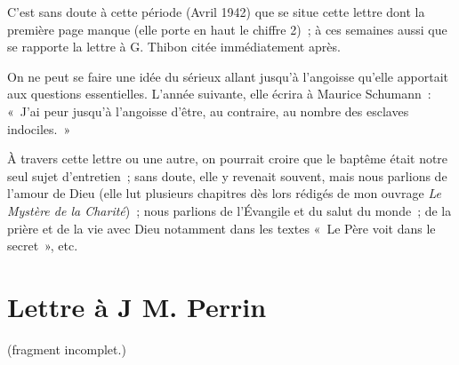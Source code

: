 \documentclass[french,twoside]{book} %
\newcommand\chapteropen{} %
\newcommand\chaptercont{} %
\begin{document}
\chaptercont
\noindent C'est sans doute à cette période (Avril 1942) que se situe cette lettre dont la première page manque (elle porte en haut le chiffre 2) ; à ces semaines aussi que se rapporte la lettre à G. Thibon citée immédiatement après.\par
On ne peut se faire une idée du sérieux allant jusqu'à l'angoisse qu'elle apportait aux questions essentielles. L'année suivante, elle écrira à Maurice Schumann : « J'ai peur jusqu'à l'angoisse d'être, au contraire, au nombre des esclaves indociles. »\par
À travers cette lettre ou une autre, on pourrait croire que le baptême était notre seul sujet d'entretien ; sans doute, elle y revenait souvent, mais nous parlions de l'amour de Dieu (elle lut plusieurs chapitres dès lors rédigés de mon ouvrage {\itshape Le Mystère de la Charité}) ; nous parlions de l'Évangile et du salut du monde ; de la prière et de la vie avec Dieu notamment dans les textes « Le Père voit dans le secret », etc. \par

\chapteropen
\chapter[Lettre à J M. Perrin]{Lettre à J M. Perrin}

\chaptercont

\begin{center}
(fragment incomplet.)\end{center}
\end{document}
